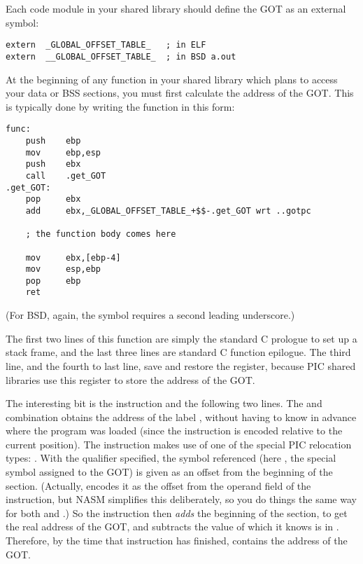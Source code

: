 
Each code module in your shared library should define the GOT as an
external symbol:

\begin{lstlisting}
extern  _GLOBAL_OFFSET_TABLE_   ; in ELF
extern  __GLOBAL_OFFSET_TABLE_  ; in BSD a.out
\end{lstlisting}

At the beginning of any function in your shared library which plans
to access your data or BSS sections, you must first calculate the
address of the GOT. This is typically done by writing the function
in this form:

\begin{lstlisting}
func:
    push    ebp
    mov     ebp,esp
    push    ebx
    call    .get_GOT
.get_GOT:
    pop     ebx
    add     ebx,_GLOBAL_OFFSET_TABLE_+$$-.get_GOT wrt ..gotpc

    ; the function body comes here

    mov     ebx,[ebp-4]
    mov     esp,ebp
    pop     ebp
    ret
\end{lstlisting}

(For BSD, again, the symbol  requires a
second leading underscore.)

The first two lines of this function are simply the standard C
prologue to set up a stack frame, and the last three lines are
standard C function epilogue. The third line, and the fourth to last
line, save and restore the  register, because PIC shared
libraries use this register to store the address of the GOT.

The interesting bit is the  instruction and the following
two lines. The  and  combination obtains the address
of the label , without having to know in advance where
the program was loaded (since the  instruction is encoded
relative to the current position). The  instruction makes use
of one of the special PIC relocation types: .
With the  qualifier specified, the symbol
referenced (here , the special symbol
assigned to the GOT) is given as an offset from the beginning of the
section. (Actually,  encodes it as the offset from the operand
field of the  instruction, but NASM simplifies this
deliberately, so you do things the same way for both  and
.) So the instruction then \emph{adds} the beginning of the
section, to get the real address of the GOT, and subtracts the value of
 which it knows is in . Therefore, by the time
that instruction has finished,  contains the address of the GOT.

